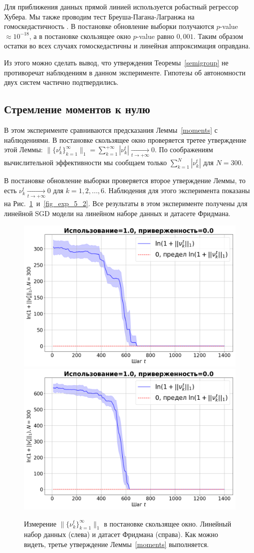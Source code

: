     Для приближения данных прямой линией используется робастный регрессор Хубера. Мы также проводим тест Бреуша-Пагана-Лагранжа на гомоскедастичность \citep{d1971omnibus}. В постановке обновление выборки получаются $p$-value $\approx 10^{-18}$, а в постановке скользящее окно $p$-value равно $0,001$. Таким образом остатки во всех случаях гомоскедастичны и линейная аппроксимация оправдана.

    Из этого можно сделать вывод, что утверждения Теоремы~\ref{semigroup} не противоречат наблюдениям в данном эксперименте. Гипотезы об автономности двух систем частично подтвердились.

\subsection{Стремление моментов к нулю} \label{exp_5}

    В этом эксперименте сравниваются предсказания Леммы~\ref{moments} с наблюдениями. В постановке скользящее окно проверяется третее утверждение этой Леммы: $\|\{\nu_k^t\}_{k=1}^{\infty}\|_1 = \sum_{k=1}^{+\infty} |\nu_k^t| \underset{t \to +\infty}{\longrightarrow} 0$. По соображениям вычислительной эффективности мы сообщаем только $\sum_{k=1}^{N} |\nu_k^t|$ для $N=300$.

    В постановке обновление выборки проверяется второе утверждение Леммы, то есть $\nu_k^t \underset{t \to +\infty}{\longrightarrow} 0$ для $k = 1, 2, ... , 6$. Наблюдения для этого эксперимента показаны на Рис.~\ref{fig_exp_5_1}~и~\ref{fig_exp_5_2}. Все результаты в этом эксперименте получены для линейной SGD модели на линейном наборе данных и датасете Фридмана.

    \begin{figure}[h!]
        \centering
        \includegraphics[width=0.49\linewidth]{pictures/k_mom_sw_synthetic_sgd_model_50_1.0_0.0.png}
        \includegraphics[width=0.49\linewidth]{pictures/k_mom_sw_friedman_sgd_model_50_1.0_0.0.png}
        
        \caption{Измерение $\|\{\nu_k^t\}_{k=1}^{\infty}\|_1$ в постановке скользящее окно. Линейный набор данных (слева) и датасет Фридмана (справа). Как можно видеть, третье утверждение Леммы~\ref{moments} выполняется.}
        \label{fig_exp_5_1}
    \end{figure}

